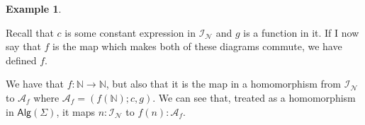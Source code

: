 \documentclass{amsart}
\theoremstyle{definition}
\newtheorem{example}[thm]{Example}
\newcommand{\nn}{\mathbb N} %
\newcommand{\ca}{\mathcal A} %
\newcommand{\cat}[1]{\mathsf{#1}} %
\begin{document}
\begin{example}
\begin{figure}[ht]
\begin{minipage}[b]{0.4\linewidth}
\begin{center}
\end{center}
\end{minipage}
\end{figure}

Recall that $c$ is some constant expression in $\mathcal I_{\mathcal N}$ and $g$ is a function in it. If I now say that $f$ is the map which makes both of these diagrams commute, we have defined $f$. 

We have that $f : \nn \to \nn$, but also that it is the map in a homomorphism from $\mathcal I_{\mathcal N}$ to $\ca_f$ where $\ca_f = (f(\nn); c, g)$. We can see that, treated as a homomorphism in $\cat{Alg}(\Sigma)$, it maps $n : \mathcal I_{\mathcal N}$ to $f(n) : \ca_f$.
\end{example}
\end{document}
